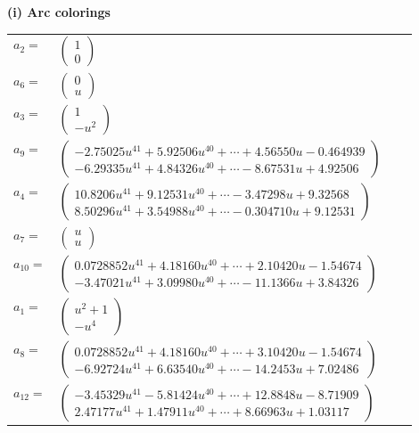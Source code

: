 \documentclass[1p]{elsarticle_modified}
\theoremstyle{definition}
\begin{document}
\flushleft \textbf{(i) Arc colorings}\\
\begin{tabular}{m{7pt} m{180pt} m{7pt} m{180pt} }
\flushright $a_{2}=$&$\begin{pmatrix}1\\0\end{pmatrix}$ \\
\flushright $a_{6}=$&$\begin{pmatrix}0\\u\end{pmatrix}$ \\
\flushright $a_{3}=$&$\begin{pmatrix}1\\- u^2\end{pmatrix}$ \\
\flushright $a_{9}=$&$\begin{pmatrix}-2.75025 u^{41}+5.92506 u^{40}+\cdots+4.56550 u-0.464939\\-6.29335 u^{41}+4.84326 u^{40}+\cdots-8.67531 u+4.92506\end{pmatrix}$ \\
\flushright $a_{4}=$&$\begin{pmatrix}10.8206 u^{41}+9.12531 u^{40}+\cdots-3.47298 u+9.32568\\8.50296 u^{41}+3.54988 u^{40}+\cdots-0.304710 u+9.12531\end{pmatrix}$ \\
\flushright $a_{7}=$&$\begin{pmatrix}u\\u\end{pmatrix}$ \\
\flushright $a_{10}=$&$\begin{pmatrix}0.0728852 u^{41}+4.18160 u^{40}+\cdots+2.10420 u-1.54674\\-3.47021 u^{41}+3.09980 u^{40}+\cdots-11.1366 u+3.84326\end{pmatrix}$ \\
\flushright $a_{1}=$&$\begin{pmatrix}u^2+1\\- u^4\end{pmatrix}$ \\
\flushright $a_{8}=$&$\begin{pmatrix}0.0728852 u^{41}+4.18160 u^{40}+\cdots+3.10420 u-1.54674\\-6.92724 u^{41}+6.63540 u^{40}+\cdots-14.2453 u+7.02486\end{pmatrix}$ \\
\flushright $a_{12}=$&$\begin{pmatrix}-3.45329 u^{41}-5.81424 u^{40}+\cdots+12.8848 u-8.71909\\2.47177 u^{41}+1.47911 u^{40}+\cdots+8.66963 u+1.03117\end{pmatrix}$ \\

\end{tabular}
\end{document}
